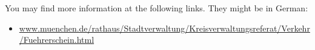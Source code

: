 \documentclass{article}
\begin{document}
You may find more information at the following links. They might be in German:
\begin{itemize}
    \item \url{www.muenchen.de/rathaus/Stadtverwaltung/Kreisverwaltungsreferat/Verkehr/Fuehrerschein.html}
\end{itemize}

\blindtext

\pagebreak 


\end{document}
